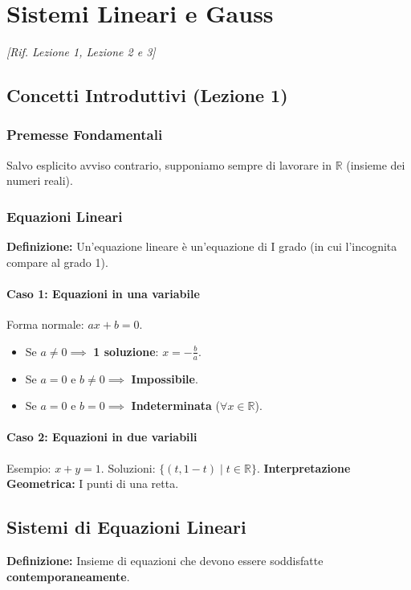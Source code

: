 \section{Sistemi Lineari e Gauss}
\emph{[Rif. Lezione 1, Lezione 2 e 3]}

\subsection{Concetti Introduttivi (Lezione 1)}

\subsubsection{Premesse Fondamentali}
Salvo esplicito avviso contrario, supponiamo sempre di lavorare in $\mathbb{R}$ (insieme dei numeri reali).

\subsubsection{Equazioni Lineari}
\textbf{Definizione:} Un'equazione lineare è un'equazione di I grado (in cui l'incognita compare al grado 1).

\paragraph{Caso 1: Equazioni in una variabile}
Forma normale: $ax + b = 0$.
\begin{itemize}
    \item Se $a \neq 0 \implies$ \textbf{1 soluzione}: $x = -\frac{b}{a}$.
    \item Se $a = 0$ e $b \neq 0 \implies$ \textbf{Impossibile}.
    \item Se $a = 0$ e $b = 0 \implies$ \textbf{Indeterminata} ($\forall x \in \mathbb{R}$).
\end{itemize}

\paragraph{Caso 2: Equazioni in due variabili}
Esempio: $x + y = 1$.
Soluzioni: $\{ (t, 1-t) \mid t \in \mathbb{R} \}$.
\textbf{Interpretazione Geometrica:} I punti di una retta.

\subsection{Sistemi di Equazioni Lineari}
\textbf{Definizione:} Insieme di equazioni che devono essere soddisfatte \textbf{contemporaneamente}.

